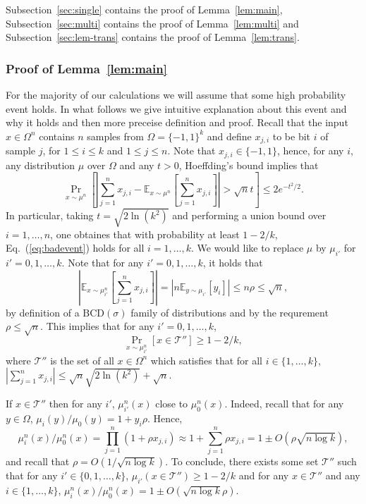 \documentclass[final, 12pt]{colt2018}
\providecommand{\BCD}{\mathrm{BCD}}
\newcommand{\subsecref}[1]{Subsection~\ref{#1}}
\renewcommand{\eqref}[1]{Eq.~(\ref{#1})}
\newcommand{\lemref}[1]{Lemma~\ref{#1}}
\begin{document}
\subsecref{sec:single} contains the proof of \lemref{lem:main}, \subsecref{sec:multi} contains the proof of \lemref{lem:multi} and \subsecref{sec:lem-trans} contains the proof of \lemref{lem:trans}.

\subsubsection{Proof of Lemma~\ref{lem:main} \label{sec:single}}

For the majority of our calculations we will assume that some high probability event holds. In what follows we give intuitive explanation about this event and why it holds and then more preceise definition and proof. Recall that the input $x \in \Omega^n$ contains $n$ samples from $\Omega = \{-1,1\}^k$ and define $x_{j,i}$ to be bit $i$ of sample $j$, for $1 \le i \le k$ and $1 \le j \le n$. Note that $x_{j,i} \in \{-1,1\}$, hence, for any $i$, any distribution $\mu$ over $\Omega$ and any $t > 0$, Hoeffding's bound implies that
\begin{equation} \label{eq:badevent}
\Pr_{x \sim \mu^n}\left[\left|\sum_{j=1}^n x_{j,i} - \mathbb{E}_{x \sim \mu^n}\left[\sum_{j=1}^n x_{j,i}\right]\right| > \sqrt{n} t \right] \le 2 e^{-t^2/2}.
\end{equation}
In particular, taking $t = \sqrt{2 \ln (k^2)}$ and performing a union bound over $i = 1, \dots, n$, one obtaines that with probability at least $1 - 2/k$, \eqref{eq:badevent} holds for all $i = 1,\dots, k$. We would like to replace $\mu$ by $\mu_{i'}$ for $i'=0,1,\dots,k$. Note that for any $i' = 0,1,\dots, k$, it holds that 
\[
\left| \mathbb{E}_{x \sim \mu_{i'}^n} \left[\sum_{j=1}^n x_{j,i}\right]\right| = \left|n \mathbb{E}_{y\sim\mu_{i'}}[y_i]\right|\le n \rho \le \sqrt{n},
\]
by definition of a $\BCD(\sigma)$ family of distributions and by the requrement $\rho \le \sqrt{n}$. 
This implies that for any $i' =0,1,\dots,k$,
\begin{equation}
\Pr_{x \sim {\mu_{i'}^n}}\left[x \in \mathcal{T}'' \right] \ge 1-2/k,
\end{equation}
where $\mathcal{T}''$ is the set of all $x \in \Omega^n$ which satisfies that for all $i \in \{1,\dots,k\}$, $\left|\sum_{j=1}^n x_{j,i} \right| \le \sqrt{n} \sqrt{2 \ln (k^2)}+\sqrt{n}$.

If $x \in \mathcal{T}''$ then for any $i'$, $\mu_{i'}^n(x)$ close to $\mu_0^n(x)$. Indeed, recall that for any $y \in \Omega$, $\mu_i(y)/\mu_0(y) = 1 + y_i \rho$. Hence,
\[
\mu_i^n(x) / \mu_0^n(x) 
= \prod_{j=1}^n (1 + \rho x_{j,i})
\approx 1 + \sum_{j=1}^n \rho x_{j,i}
= 1 \pm O(\rho \sqrt{n \log k}),
\]
and recall that $\rho = O(1/\sqrt{n \log k})$.
To conclude, there exists some set $\mathcal{T}''$ such that for any $i' \in \{0,1,\dots,k\}$, $\mu_{i'}(x \in \mathcal{T}'') \ge 1-2/k$ and for any $x \in \mathcal{T}''$ and any $i \in \{1,\dots,k\}$, $\mu_i^n(x)/\mu_0^n(x) = 1 \pm O(\sqrt{n \log k} \rho)$.
\end{document}
